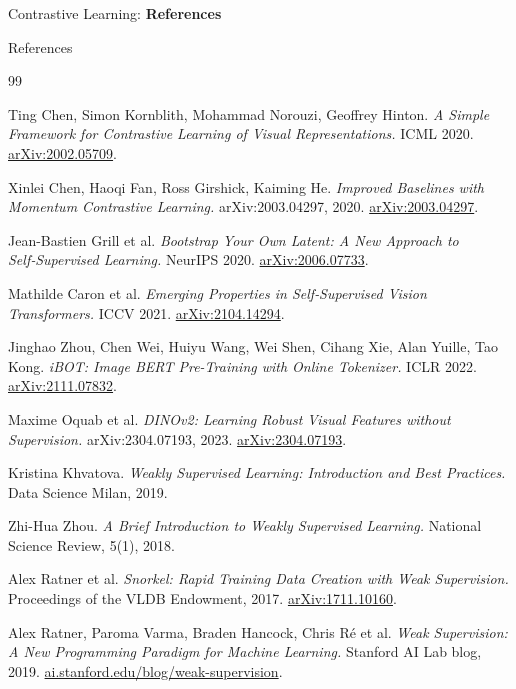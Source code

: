 \begin{frame}{}
    \LARGE Contrastive Learning: \textbf{References}
\end{frame}

\begin{frame}[allowframebreaks]{References}
\begin{thebibliography}{99}

Ting Chen, Simon Kornblith, Mohammad Norouzi, Geoffrey Hinton. \emph{A Simple Framework for Contrastive Learning of Visual Representations.} ICML 2020. \href{https://arxiv.org/abs/2002.05709}{arXiv:2002.05709}.

Xinlei Chen, Haoqi Fan, Ross Girshick, Kaiming He. \emph{Improved Baselines with Momentum Contrastive Learning.} arXiv:2003.04297, 2020. \href{https://arxiv.org/abs/2003.04297}{arXiv:2003.04297}.

Jean-Bastien Grill et al. \emph{Bootstrap Your Own Latent: A New Approach to Self‑Supervised Learning.} NeurIPS 2020. \href{https://arxiv.org/abs/2006.07733}{arXiv:2006.07733}.

Mathilde Caron et al. \emph{Emerging Properties in Self‑Supervised Vision Transformers.} ICCV 2021. \href{https://arxiv.org/abs/2104.14294}{arXiv:2104.14294}.

Jinghao Zhou, Chen Wei, Huiyu Wang, Wei Shen, Cihang Xie, Alan Yuille, Tao Kong. \emph{iBOT: Image BERT Pre-Training with Online Tokenizer.} ICLR 2022. \href{https://arxiv.org/abs/2111.07832}{arXiv:2111.07832}.

Maxime Oquab et al. \emph{DINOv2: Learning Robust Visual Features without Supervision.} arXiv:2304.07193, 2023. \href{https://arxiv.org/abs/2304.07193}{arXiv:2304.07193}.

Kristina Khvatova. \emph{Weakly Supervised Learning: Introduction and Best Practices.} Data Science Milan, 2019.

Zhi-Hua Zhou. \emph{A Brief Introduction to Weakly Supervised Learning.} National Science Review, 5(1), 2018.

Alex Ratner et al. \emph{Snorkel: Rapid Training Data Creation with Weak Supervision.} Proceedings of the VLDB Endowment, 2017. \href{https://arxiv.org/abs/1711.10160}{arXiv:1711.10160}.

Alex Ratner, Paroma Varma, Braden Hancock, Chris R\'e et al. \emph{Weak Supervision: A New Programming Paradigm for Machine Learning.} Stanford AI Lab blog, 2019. \href{https://ai.stanford.edu/blog/weak-supervision/}{ai.stanford.edu/blog/weak-supervision}.


\end{thebibliography}
\end{frame}

